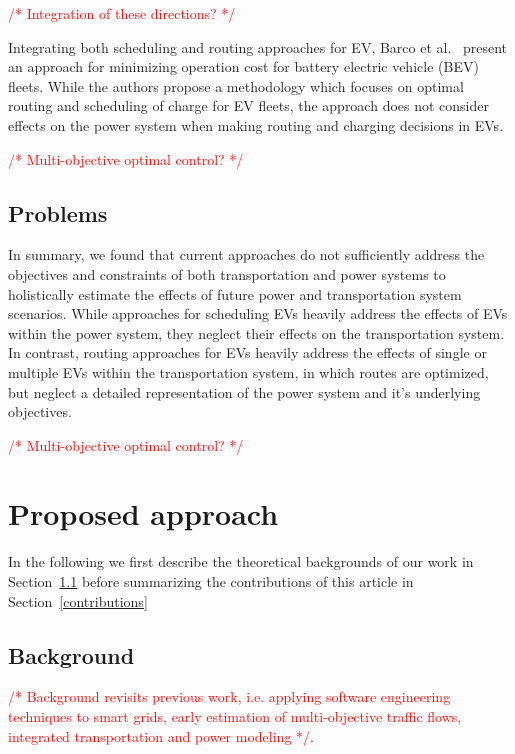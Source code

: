 \documentclass[conference]{IEEEtran}
\newcommand{\todo}[1]{\textcolor{red}{/* #1 */}}
\begin{document}
	\todo{Integration of these directions?}
	
	Integrating both scheduling and routing approaches for EV, Barco et al.~\cite{barco2013optimal} present an approach for minimizing operation cost for battery electric vehicle (BEV) fleets. While the authors propose a methodology which focuses on optimal routing and scheduling of charge for EV fleets, the approach does not consider effects on the power system when making routing and charging decisions in EVs.

	\todo{Multi-objective optimal control?}
	
	\subsection{Problems}
	\label{problems}
	
	In summary, we found that current approaches do not sufficiently address the objectives and constraints of both transportation and power systems to holistically estimate the effects of future power and transportation system scenarios. While approaches for scheduling EVs heavily address the effects of EVs within the power system, they neglect their effects on the transportation system. In contrast, routing approaches for EVs heavily address the effects of single or multiple EVs within the transportation system, in which routes are optimized, but neglect a detailed representation of the power system and it's underlying objectives.
	
	\todo{Multi-objective optimal control?}
	
	\section{Proposed approach}
	\label{proposed_work}
	
	In the following we first describe the theoretical backgrounds of our work in Section~\ref{backgrounds} before summarizing the contributions of this article in Section~\ref{contributions}
	
	\subsection{Background}
	\label{backgrounds}
	
	 \todo{Background revisits previous work, i.e. applying software engineering techniques to smart grids, early estimation of multi-objective traffic flows, integrated transportation and power modeling}. 
	 
\end{document}
